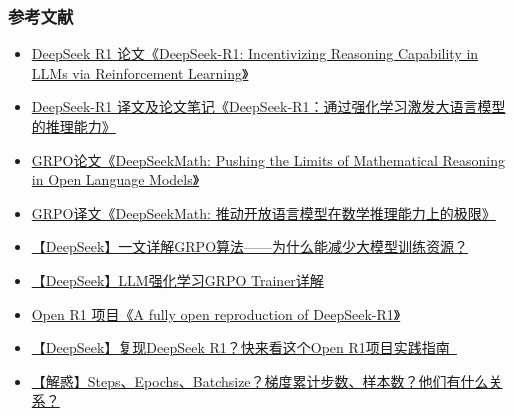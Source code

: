 \documentclass[8pt,aspectratio=169]{beamer}
\begin{document}
\begin{frame}
    \frametitle{参考文献}
    {\small
    \begin{itemize}
        \item \href{https://arxiv.org/abs/2501.12948}{DeepSeek R1 论文《DeepSeek-R1: Incentivizing Reasoning Capability in LLMs via Reinforcement Learning》}
        \item \href{https://blog.csdn.net/qq_38961840/article/details/145556531}{DeepSeek-R1 译文及论文笔记《DeepSeek-R1：通过强化学习激发大语言模型的推理能力》}
        \item \href{https://arxiv.org/abs/2402.03300}{GRPO论文《DeepSeekMath: Pushing the Limits of Mathematical Reasoning in Open Language Models》}
        \item \href{https://blog.csdn.net/qq_38961840/article/details/145384346}{GRPO译文《DeepSeekMath: 推动开放语言模型在数学推理能力上的极限》}
        \item \href{https://blog.csdn.net/qq_38961840/article/details/145384852}{【DeepSeek】一文详解GRPO算法——为什么能减少大模型训练资源？}
        \item \href{https://blog.csdn.net/qq_38961840/article/details/145387854}{【DeepSeek】LLM强化学习GRPO Trainer详解}
        \item \href{https://github.com/huggingface/open-r1}{Open R1 项目《A fully open reproduction of DeepSeek-R1》}
        \item \href{https://blog.csdn.net/qq_38961840/article/details/145388142}{【DeepSeek】复现DeepSeek R1？快来看这个Open R1项目实践指南~}
        \item \href{https://blog.csdn.net/qq_38961840/article/details/145559997}{【解惑】Steps、Epochs、Batchsize？梯度累计步数、样本数？他们有什么关系？}
    \end{itemize}
    }
\end{frame}
\end{document}
